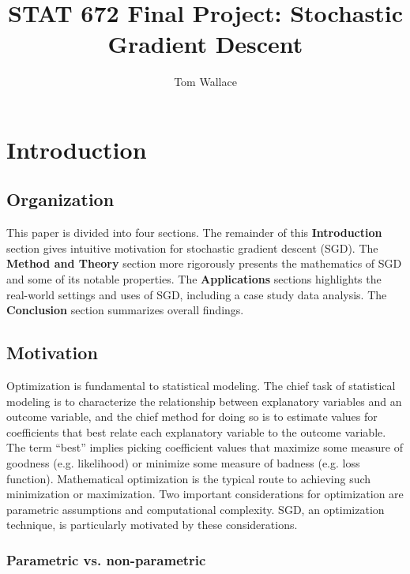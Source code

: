 \documentclass{article}
\author{Tom Wallace}
\title{STAT 672 Final Project: Stochastic Gradient Descent}
\begin{document}
\maketitle

\section{Introduction}

\subsection{Organization}

This paper is divided into four sections. The remainder of this
\textbf{Introduction} section gives intuitive motivation for stochastic gradient
descent (SGD). The \textbf{Method and Theory} section more rigorously presents the
mathematics of SGD and some of its notable properties. The
\textbf{Applications} sections highlights the real-world settings and uses of SGD,
including a case study data analysis. The \textbf{Conclusion} section summarizes
overall findings.

\subsection{Motivation}

Optimization is fundamental to statistical modeling. The chief task of
statistical modeling is to characterize the relationship between 
explanatory variables and an outcome variable, and the chief method for doing so
is to estimate values for coefficients that best relate
each explanatory variable to the outcome variable. The term ``best''
implies picking coefficient values that
maximize some measure of goodness (e.g. likelihood) or minimize some measure of
badness (e.g. loss function). 
Mathematical optimization is the typical
route to achieving such minimization or maximization. Two important
considerations for optimization are parametric assumptions and computational
complexity. SGD, an optimization technique, is
particularly motivated by these considerations.

\subsubsection{Parametric vs. non-parametric}
\end{document}
